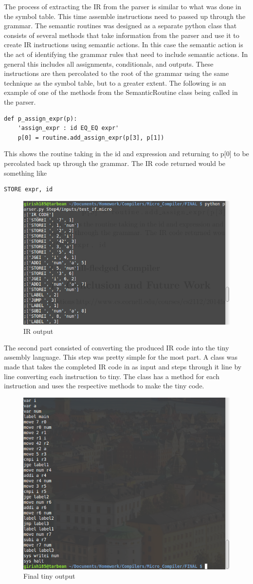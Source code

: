 \documentclass[12pt, oneside]{article}   	%
\begin{document}
The process of extracting the IR from the parser is similar to what was done in the symbol table. This time assemble instructions need to passed up through the grammar.  The semantic routines was designed as a separate python class that consists of several methods that take information from the parser and use it to create IR instructions using semantic actions. In this case the semantic action is the act of identifying the grammar rules that need to include semantic actions. In general this includes all assignments, conditionals, and outputs. These instructions are then percolated to the root of the grammar using the same technique as the symbol table, but to a greater extent. The following is an example of one of the methods from the SemanticRoutine class being called in the parser.
\begin{lstlisting}
def p_assign_expr(p):
	'assign_expr : id EQ_EQ expr'
	p[0] = routine.add_assign_expr(p[3], p[1])
\end{lstlisting}
This shows the routine taking in the id and expression and returning to p[0] to be percolated back up through the grammar. The IR code returned would be something like 
\begin{lstlisting}
STORE expr, id
\end{lstlisting}
\begin{figure}[h!]
	\centerline{\includegraphics[width=.4\linewidth]{pics/ir}}
	\caption{IR output}
\end{figure}

The second part consisted of converting the produced IR code into the tiny assembly language. This step was pretty simple for the most part. A class was made that takes the completed IR code in as input and steps through it line by line converting each instruction to tiny. The class has a method for each instruction and uses the respective methods to make the tiny code. 
\begin{figure}[h!]
	\centerline{\includegraphics[width=.4\linewidth]{pics/tiny}}
	\caption{Final tiny output}
\end{figure}
\end{document}
